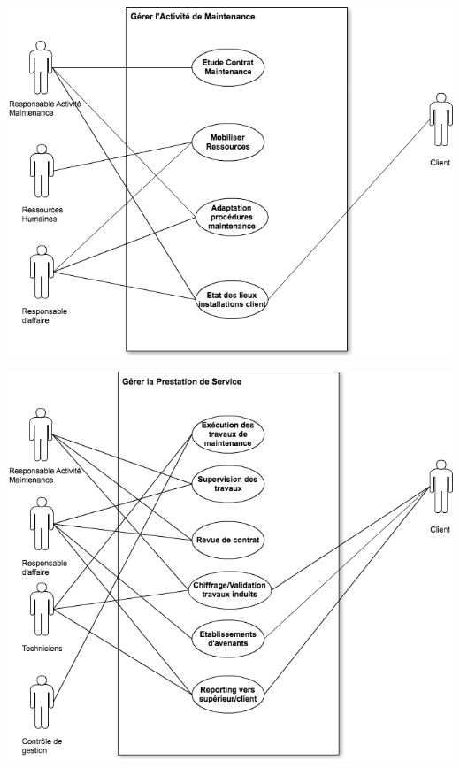 \begin {center}
\includegraphics[width=\textwidth]{png_generaux/DCUGererActiMaintenance.png}
\end {center}

\begin {center}
\includegraphics[width=\textwidth]{png_generaux/DCUGererPrestationService.png}
\end {center}

